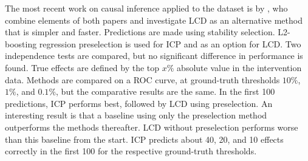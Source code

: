 The most recent work on causal inference applied to the \citet{kemmeren2014large} dataset is by \textbf{\citet{versteeg2019boosting}}, who combine elements of both papers and investigate LCD as an alternative method that is simpler and faster. Predictions are made using stability selection. L2-boosting regression preselection is used for ICP and as an option for LCD. Two independence tests are compared, but no significant difference in performance is found. True effects are defined by the top $x\%$ absolute value in the intervention data. Methods are compared on a ROC curve, at ground-truth thresholds $10\%$, $1\%$, and $0.1\%$, but the comparative results are the same. In the first 100 predictions, ICP performs best, followed by LCD using preselection. An interesting result is that a baseline using only the preselection method outperforms the methods thereafter. LCD without preselection performs worse than this baseline from the start. ICP predicts about 40, 20, and 10 effects correctly in the first 100 for the respective ground-truth thresholds.


